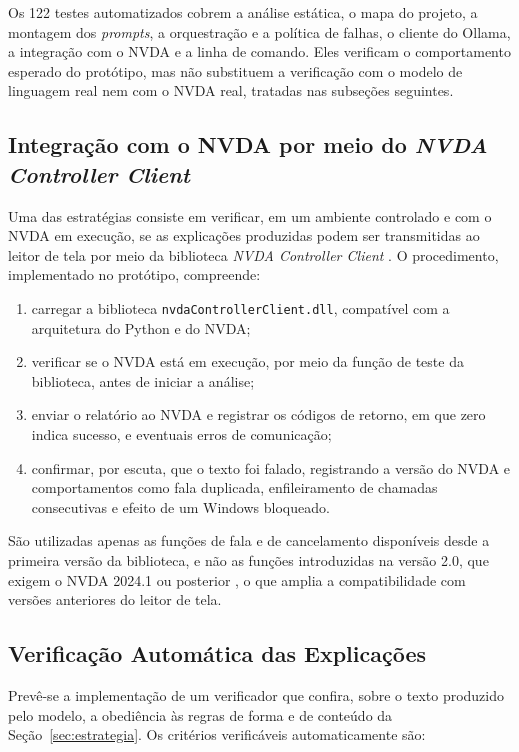 \documentclass[
    12pt,                   %
    openright,              %
    oneside,                %
    a4paper,                %
    sumario=tradicional,    %
    english,                %
    brazil,                 %
    ]{abntex2}
\begin{document}
Os 122 testes automatizados cobrem a análise estática, o mapa do projeto, a montagem dos \textit{prompts}, a orquestração e a política de falhas, o cliente do Ollama, a integração com o NVDA e a linha de comando. Eles verificam o comportamento esperado do protótipo, mas não substituem a verificação com o modelo de linguagem real nem com o NVDA real, tratadas nas subseções seguintes.

\subsection{Integração com o NVDA por meio do \textit{NVDA Controller Client}}

Uma das estratégias consiste em verificar, em um ambiente controlado e com o NVDA em execução, se as explicações produzidas podem ser transmitidas ao leitor de tela por meio da biblioteca \textit{NVDA Controller Client} \cite{nvaccess2024controller}. O procedimento, implementado no protótipo, compreende:

\begin{enumerate}
  \item carregar a biblioteca \texttt{nvdaControllerClient.dll}, compatível com a arquitetura do Python e do NVDA;
  \item verificar se o NVDA está em execução, por meio da função de teste da biblioteca, antes de iniciar a análise;
  \item enviar o relatório ao NVDA e registrar os códigos de retorno, em que zero indica sucesso, e eventuais erros de comunicação;
  \item confirmar, por escuta, que o texto foi falado, registrando a versão do NVDA e comportamentos como fala duplicada, enfileiramento de chamadas consecutivas e efeito de um Windows bloqueado.
\end{enumerate}

São utilizadas apenas as funções de fala e de cancelamento disponíveis desde a primeira versão da biblioteca, e não as funções introduzidas na versão 2.0, que exigem o NVDA 2024.1 ou posterior \cite{nvaccess2024controller}, o que amplia a compatibilidade com versões anteriores do leitor de tela.

\subsection{Verificação Automática das Explicações}\label{sec:verificador}

Prevê-se a implementação de um verificador que confira, sobre o texto produzido pelo modelo, a obediência às regras de forma e de conteúdo da Seção~\ref{sec:estrategia}. Os critérios verificáveis automaticamente são:
\end{document}
